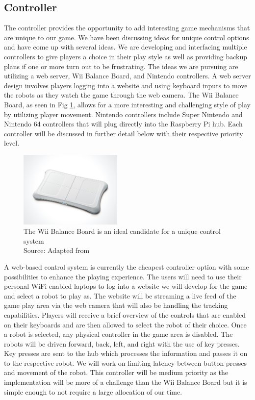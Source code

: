\documentclass[11pt]{ieeeconf}
\begin{document}
\subsection{Controller}
The controller provides the opportunity to add interesting game mechanisms that are unique to our game. We have been discussing ideas for unique control options and have come up with several ideas. We are developing and interfacing multiple controllers to give players a choice in their play style as well as providing backup plans if one or more turn out to be frustrating. The ideas we are pursuing are utilizing a web server, Wii Balance Board, and Nintendo controllers. A web server design involves players logging into a website and using keyboard inputs to move the robots as they watch the game through the web camera. The Wii Balance Board, as seen in Fig \ref{Wii}, allows for a more interesting and challenging style of play by utilizing player movement. Nintendo controllers include Super Nintendo and Nintendo 64 controllers that will plug directly into the Raspberry Pi hub. Each controller will be discussed in further detail below with their respective priority level.

\begin{figure}[h]
\centering
\captionsetup{justification=centering}
\includegraphics[width=0.45\textwidth]{images/wii.png}
\caption{The Wii Balance Board is an ideal candidate for a unique control system\\ Source: Adapted from \cite{wiiboard:19}}
\label{Wii}
\end{figure}

A web-based control system is currently the cheapest controller option with some possibilities to enhance the playing experience. The users will need to use their personal WiFi enabled laptops to log into a website we will develop for the game and select a robot to play as. The website will be streaming a live feed of the game play area via the web camera that will also be handling the tracking capabilities. Players will receive a brief overview of the controls that are enabled on their keyboards and are then allowed to select the robot of their choice. Once a robot is selected, any physical controller in the game area is disabled. The robots will be driven forward, back, left, and right with the use of key presses. Key presses are sent to the hub which processes the information and passes it on to the respective robot. We will work on limiting latency between button presses and movement of the robot. This controller will be medium priority as the implementation will be more of a challenge than the Wii Balance Board but it is simple enough to not require a large allocation of our time.
\end{document}
